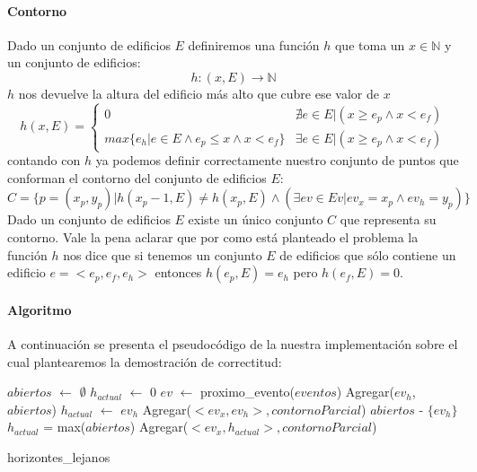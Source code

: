 \paragraph{Contorno}
Dado un conjunto de edificios $E$ definiremos una función $h$ que toma un $x \in \mathbb{N}$ y un conjunto de edificios:
\begin{displaymath}
	h: (x,E) \to \mathbb{N} 
\end{displaymath}
$h$ nos devuelve la altura del edificio más alto que cubre ese valor de $x$ 
\begin{displaymath}
	h(x, E) = \begin{cases} 
						0 & \nexists e \in E | (x \geq e_p \land x < e_f) \\
						max\{ e_h | e \in E  \land e_p \leq x \land x < e_f \} & \exists e \in E | (x \geq e_p \land x < e_f)
				\end{cases} %
\end{displaymath}
contando con $h$ ya podemos definir correctamente nuestro conjunto de puntos que conforman el contorno del
conjunto de edificios $E$:
\begin{displaymath}
	C = \{ p = (x_p, y_p) | h(x_p - 1, E) \neq h(x_p, E) \land (\exists ev \in Ev | ev_x = x_p \land ev_h = y_p) \}
\end{displaymath}
Dado un conjunto de edificios $E$ existe un único conjunto $C$ que representa su contorno. 
Vale la pena aclarar que por como está planteado el problema la función $h$ nos dice que si tenemos un conjunto $E$
de edificios que sólo contiene un edificio $e = <e_p, e_f, e_h>$ entonces $h(e_p, E) = e_h$ pero $h(e_f, E) = 0$.

\paragraph{Algoritmo} 
A continuación se presenta el pseudocódigo de la nuestra implementación sobre el cual plantearemos la
demostración de correctitud:

\begin{algorithm}[H]
\begin{algorithmic}
\STATE $abiertos$ $\gets$ $\emptyset$
\STATE $h_{actual}$ $\gets$ 0
	\STATE $ev$ $\gets$ proximo\_evento($eventos$)
		\STATE Agregar($ev_h$, $abiertos$)
			\STATE $h_{actual}$ $\gets$ $ev_h$
			\STATE Agregar($<ev_x, ev_h>, contornoParcial$)
		\ENDIF
	\ELSE
		\STATE $abiertos$ - $\{ ev_h \}$
			\STATE $h_{actual}$ = max($abiertos$)
			\STATE Agregar($<ev_x, h_{actual}>, contornoParcial$)  
		\ENDIF
	\ENDIF
\ENDWHILE
\caption{horizontes\_lejanos}
\end{algorithmic}
\end{algorithm}

